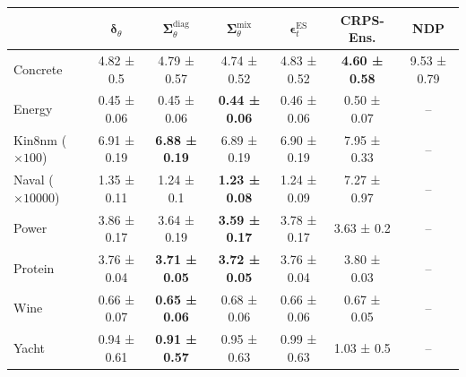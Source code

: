 \begin{tabular}{l|c|c|c|c|c|c}
\toprule
 & $\bm\delta_\theta$ & $\bm\Sigma_\theta^{\mathrm{diag}}$ & $\bm\Sigma_\theta^{\mathrm{mix}}$ & $\bm\epsilon_t^\mathrm{ES}$ & CRPS-Ens. & NDP \\
\midrule
Concrete & 4.82 ± 0.5 & 4.79 ± 0.57 & 4.74 ± 0.52 & 4.83 ± 0.52 & \textbf{4.60 ± 0.58} & 9.53 ± 0.79 \\
Energy & 0.45 ± 0.06 & 0.45 ± 0.06 & \textbf{0.44 ± 0.06} & 0.46 ± 0.06 & 0.50 ± 0.07 & -- \\
Kin8nm ($\times 100$) & 6.91 ± 0.19 & \textbf{6.88 ± 0.19} & 6.89 ± 0.19 & 6.90 ± 0.19 & 7.95 ± 0.33 & -- \\
Naval ($\times 10000$) & 1.35 ± 0.11 & 1.24 ± 0.1 & \textbf{1.23 ± 0.08} & 1.24 ± 0.09 & 7.27 ± 0.97 & -- \\
Power & 3.86 ± 0.17 & 3.64 ± 0.19 & \textbf{3.59 ± 0.17} & 3.78 ± 0.17 & 3.63 ± 0.2 & -- \\
Protein & 3.76 ± 0.04 & \textbf{3.71 ± 0.05} & \textbf{3.72 ± 0.05} & 3.76 ± 0.04 & 3.80 ± 0.03 & -- \\
Wine & 0.66 ± 0.07 & \textbf{0.65 ± 0.06} & 0.68 ± 0.06 & 0.66 ± 0.06 & 0.67 ± 0.05 & -- \\
Yacht & 0.94 ± 0.61 & \textbf{0.91 ± 0.57} & 0.95 ± 0.63 & 0.99 ± 0.63 & 1.03 ± 0.5 & -- \\
\bottomrule
\end{tabular}
